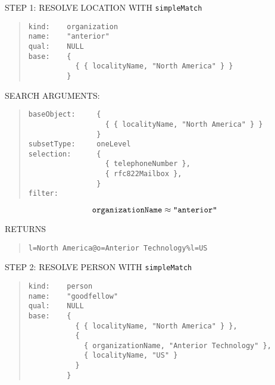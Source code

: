 \begin{bwslide}

\begin{nrtc}
\item	STEP 1: RESOLVE LOCATION WITH \verb"simpleMatch"
\begin{quote}\small\begin{verbatim}
kind:    organization
name:    "anterior"
qual:    NULL
base:    {
           { { localityName, "North America" } }
         }
\end{verbatim}\end{quote}

\item	SEARCH ARGUMENTS:
\begin{quote}\small\begin{verbatim}
baseObject:     {
                  { { localityName, "North America" } }
                }
subsetType:     oneLevel
selection:      {
                  { telephoneNumber },
                  { rfc822Mailbox },
                }
filter:
\end{verbatim}\end{quote}
\[\mbox{\tt organizationName}\approx\mbox{\tt "anterior"}\]

\item	RETURNS
\begin{quote}\small\begin{verbatim}
l=North America@o=Anterior Technology%l=US
\end{verbatim}\end{quote}
\end{nrtc}
\end{bwslide}


\begin{bwslide}

\begin{nrtc}
\item	STEP 2: RESOLVE PERSON WITH \verb"simpleMatch"
\begin{quote}\small\begin{verbatim}
kind:    person
name:    "goodfellow"
qual:    NULL
base:    {
           { { localityName, "North America" } },
           {
             { organizationName, "Anterior Technology" },
             { localityName, "US" }
           }
         }
\end{verbatim}\end{quote}
\end{nrtc}
\end{bwslide}


